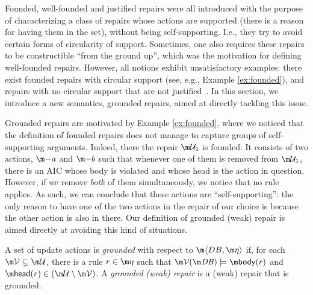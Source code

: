 Founded, well-founded and justified repairs were all introduced with the purpose of characterizing a class of repairs whose actions are supported (there is a reason for having them in the set), without being self-supporting. I.e., they try to avoid certain forms of circularity of support. 
Sometimes, one also requires these repairs to be constructible ``from the ground up'', which was the motivation for defining well-founded repairs.
However, all notions exhibit unsatisfactory examples: there exist founded repairs with circular support (see, e.g., Example \ref{ex:founded}), and repairs with no circular support that are not justified~\cite{tase/Cruz-FilipeEGN13}. %
In this section, we introduce a new semantics, grounded repairs, aimed at directly tackling this issue. 

Grounded repairs are motivated by Example \ref{ex:founded}, where we noticed that the definition of founded repairs does not manage to capture groups of self-supporting arguments. 
Indeed, there the repair $\UU_1$ is founded. It consists of two actions, $\remove a$ and $\remove b$ such that whenever one of them is removed from $\UU_1$, there is an AIC whose body is violated and whose head is the action in question. 
However, if we remove \emph{both} of them simultaneously, we notice that no rule applies. As such, we can conclude that these actions are ``self-supporting'': the only reason to have one of the two actions in the repair of our choice is because the other action is also in there. 
Our definition of grounded (weak) repair is aimed directly at avoiding this kind of situations. 

\begin{definition}\label{def:grounded}
 A set of update actions \UU is \emph{grounded} with respect to $\fulldb$ if, for each $\VV \subsetneq  \UU$, there is a rule  $r\in \aics$ such that $\VV(\db)\models \body(r)$ and $\head(r)\in(\UU\setminus\VV)$. A \emph{grounded (weak) repair} is a (weak) repair that is grounded.
\end{definition}
  
